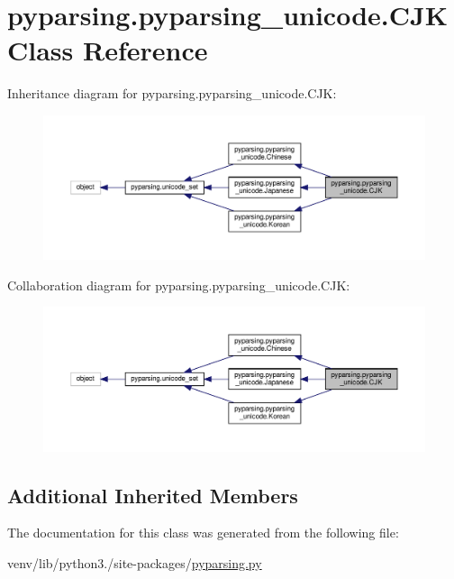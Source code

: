 \hypertarget{classpyparsing_1_1pyparsing__unicode_1_1CJK}{}\section{pyparsing.\+pyparsing\+\_\+unicode.\+C\+JK Class Reference}
\label{classpyparsing_1_1pyparsing__unicode_1_1CJK}


Inheritance diagram for pyparsing.\+pyparsing\+\_\+unicode.\+C\+JK\+:
\nopagebreak
\begin{figure}[H]
\begin{center}
\leavevmode
\includegraphics[width=350pt]{classpyparsing_1_1pyparsing__unicode_1_1CJK__inherit__graph}
\end{center}
\end{figure}


Collaboration diagram for pyparsing.\+pyparsing\+\_\+unicode.\+C\+JK\+:
\nopagebreak
\begin{figure}[H]
\begin{center}
\leavevmode
\includegraphics[width=350pt]{classpyparsing_1_1pyparsing__unicode_1_1CJK__coll__graph}
\end{center}
\end{figure}
\subsection*{Additional Inherited Members}


The documentation for this class was generated from the following file\+:\begin{DoxyCompactItemize}
\item 
venv/lib/python3./site-\/packages/\hyperlink{pyparsing_8py}{pyparsing.\+py}\end{DoxyCompactItemize}
